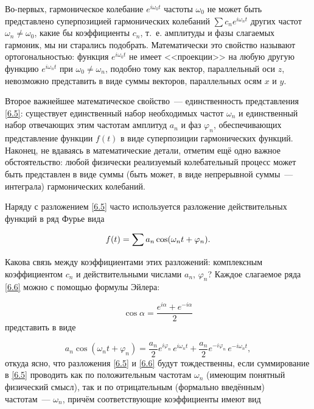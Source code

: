 Во-первых, гармоническое колебание $e^{i\omega_0 t}$ частоты $\omega_0$ не может быть представлено суперпозицией
гармонических колебаний $\sum c_n e^{i\omega_n t}$ других частот $\omega_n\ne\omega_0$, какие бы коэффициенты $c_n$,
т.~е. амплитуды и фазы слагаемых гармоник, мы ни старались подобрать. Математически это свойство называют
ортогональностью: функция $e^{i\omega_0 t}$ не имеет <<проекции>> на любую другую функцию $e^{i\omega_nt}$ при
$\omega_0\ne\omega_n$, подобно тому как вектор, параллельный оси $z$, невозможно представить в виде суммы векторов,
параллельных осям $x$ и $y$.

Второе важнейшее математическое свойство~--- единственность представления \eqref{6.5}: существует единственный набор
необходимых частот $\omega_n$ и единственный набор отвечающих этим частотам амплитуд $a_n$ и фаз $\varphi_n$, обеспечивающих
представление функции $f(t)$ в виде суперпозиции гармонических функций. Наконец, не вдаваясь в математические детали,
отметим ещё одно важное обстоятельство: любой физически реализуемый колебательный процесс может быть представлен в виде
суммы (быть может, в виде непрерывной суммы~--- интеграла) гармонических колебаний.

Наряду с разложением \eqref{6.5} часто используется разложение действительных функций в ряд Фурье вида

\begin{equation}
	\eqmark{6.6}
	f(t)=\sum a_n \cos(\omega_n t+\varphi_n ).
\end{equation}

Какова связь между коэффициентами этих разложений: комплексным коэффициентом $c_n$ и действительными числами $a_n$,
$\varphi_n$? Каждое слагаемое ряда \eqref{6.6} можно с помощью формулы Эйлера:

\begin{equation*}
	\cos\alpha=\frac{e^{i\alpha}+e^{-i\alpha}}{2}
\end{equation*}
представить в виде

\begin{equation*}
	a_n\cos(\omega_nt+\varphi_n)=\frac{a_n}{2}e^{i\varphi_n}\,e^{i\omega_n t}+\frac{a_n}{2}e^{-i\varphi_n}\,e^{-i\omega_n t},
\end{equation*}
откуда ясно, что разложения \eqref{6.5} и \eqref{6.6} будут тождественны, если суммирование в \eqref{6.5} проводить как по
положительным частотам $\omega_n$ (имеющим понятный физический смысл), так и по отрицательным (формально введённым)
частотам~--- $\omega_n$, причём соответствующие коэффициенты имеют вид

